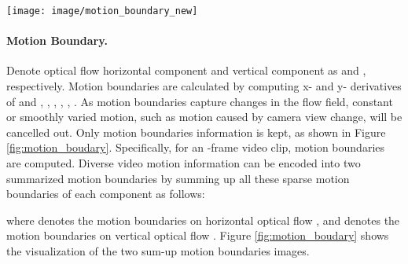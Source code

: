 \documentclass[10pt,twocolumn,letterpaper]{article}
\begin{document}
\begin{figure*}[t]
    \centering
   \texttt{[image: image/motion\_boundary\_new]}
   \caption{Motion boundaries computation. For a given input video clip, we first extract optical flow across each frame. For each optical flow, two motion boundaries are obtained by computing gradients separately on the horizontal and vertical components of the optical flow. The final sum-up motion boundaries are obtained by aggregating the motion boundaries on \emph{u\_flow} and \emph{v\_flow} of each frame separately.}\vspace{1mm}
\label{fig:motion_boudary}\end{figure*}

\vspace{-3mm}
\paragraph{Motion Boundary.} 
Denote optical flow horizontal component and vertical component as  and , respectively. 
Motion boundaries are calculated by computing x- and y- derivatives of  and , \ie, , , , . 
As motion boundaries capture changes in the flow field, constant or smoothly varied motion, such as motion caused by camera view change, will be cancelled out. Only motion boundaries information is kept, as shown in Figure \ref{fig:motion_boudary}. 
Specifically, for an -frame video clip,   motion boundaries are computed. 
Diverse video motion information can be encoded into two summarized motion boundaries by summing up all these  sparse motion boundaries of each component as follows:

where  denotes the motion boundaries on horizontal optical flow , and  denotes the motion boundaries on vertical optical flow . 
Figure \ref{fig:motion_boudary} shows the visualization of the two sum-up motion boundaries images.
\end{document}
